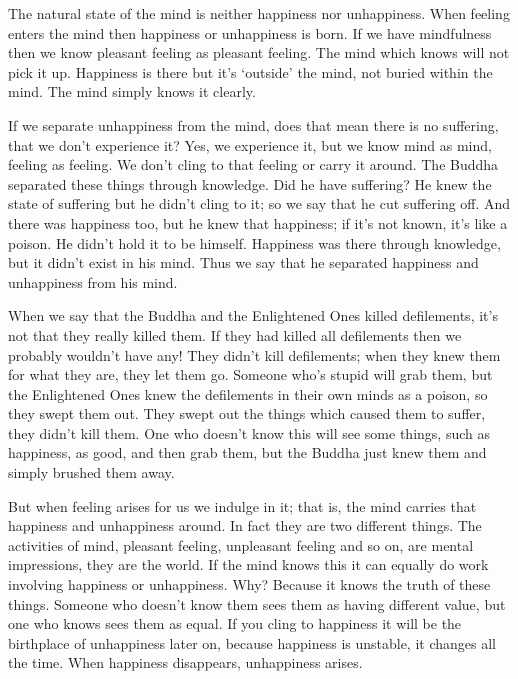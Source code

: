 The natural state of the mind is neither happiness nor unhappiness. When feeling enters the mind then happiness or unhappiness is born. If we have mindfulness then we know pleasant feeling as pleasant feeling. The mind which knows will not pick it up. Happiness is there but it's `outside' the mind, not buried within the mind. The mind simply knows it clearly.

If we separate unhappiness from the mind, does that mean there is no suffering, that we don't experience it? Yes, we experience it, but we know mind as mind, feeling as feeling. We don't cling to that feeling or carry it around. The Buddha separated these things through knowledge. Did he have suffering? He knew the state of suffering but he didn't cling to it; so we say that he cut suffering off. And there was happiness too, but he knew that happiness; if it's not known, it's like a poison. He didn't hold it to be himself. Happiness was there through knowledge, but it didn't exist in his mind. Thus we say that he separated happiness and unhappiness from his mind.

When we say that the Buddha and the Enlightened Ones killed defilements, it's not that they really killed them. If they had killed all defilements then we probably wouldn't have any! They didn't kill defilements; when they knew them for what they are, they let them go. Someone who's stupid will grab them, but the Enlightened Ones knew the defilements in their own minds as a poison, so they swept them out. They swept out the things which caused them to suffer, they didn't kill them. One who doesn't know this will see some things, such as happiness, as good, and then grab them, but the Buddha just knew them and simply brushed them away.

But when feeling arises for us we indulge in it; that is, the mind carries that happiness and unhappiness around. In fact they are two different things. The activities of mind, pleasant feeling, unpleasant feeling and so on, are mental impressions, they are the world. If the mind knows this it can equally do work involving happiness or unhappiness. Why? Because it knows the truth of these things. Someone who doesn't know them sees them as having different value, but one who knows sees them as equal. If you cling to happiness it will be the birthplace of unhappiness later on, because happiness is unstable, it changes all the time. When happiness disappears, unhappiness arises.

